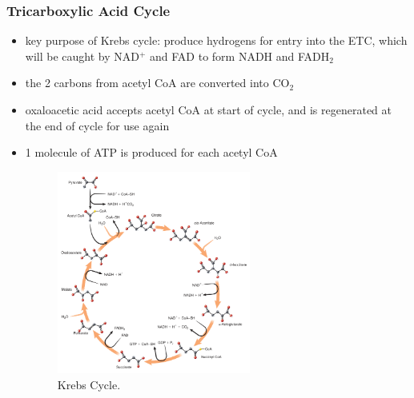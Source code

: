 \documentclass[10pt]{article}
\begin{document}
\subsubsection*{Tricarboxylic Acid Cycle}
\begin{itemize}
    \item key purpose of Krebs cycle: produce hydrogens for entry into the ETC, which will be caught by NAD$^+$ and FAD to form NADH and FADH$_2$
    \item the 2 carbons from acetyl CoA are converted into CO$_2$
    \item oxaloacetic acid accepts acetyl CoA at start of cycle, and is regenerated at the end of cycle for use again
    \item 1 molecule of ATP is produced for each acetyl CoA
        \begin{figure}[h]
            \centering
            \includegraphics[width=0.6\textwidth]{krebsCycle}
            \caption{Krebs Cycle. }
            \label{fig:krebsCycle}
        \end{figure}
\end{itemize}
\end{document}
